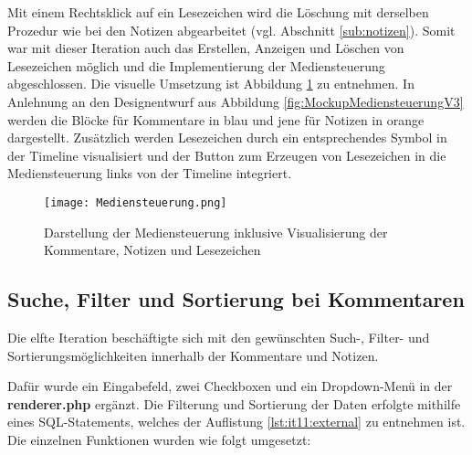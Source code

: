 Mit einem Rechtsklick auf ein Lesezeichen wird die Löschung mit derselben Prozedur wie bei den Notizen abgearbeitet (vgl. Abschnitt \ref{sub:notizen}). Somit war mit dieser Iteration auch das Erstellen, Anzeigen und Löschen von Lesezeichen möglich und die Implementierung der Mediensteuerung abgeschlossen. Die visuelle Umsetzung ist Abbildung \ref{fig:Mediensteuerung} zu entnehmen. In Anlehnung an den Designentwurf aus Abbildung \ref{fig:MockupMediensteuerungV3} werden die Blöcke für Kommentare in blau und jene für Notizen in orange dargestellt. Zusätzlich werden Lesezeichen durch ein entsprechendes Symbol in der Timeline visualisiert und der Button zum Erzeugen von Lesezeichen in die Mediensteuerung links von der Timeline integriert.

\begin{figure}[h!]
\texttt{[image: Mediensteuerung.png]}
\caption{\label{fig:Mediensteuerung}Darstellung der Mediensteuerung inklusive Visualisierung der Kommentare, Notizen und Lesezeichen}
\end{figure}

\subsection{Suche, Filter und Sortierung bei Kommentaren}
Die elfte Iteration beschäftigte sich mit den gewünschten Such-, Filter- und Sortierungsmöglichkeiten innerhalb der Kommentare und Notizen.

Dafür wurde ein Eingabefeld, zwei Checkboxen und ein Dropdown-Menü in der \textbf{renderer.php} ergänzt. Die Filterung und Sortierung der Daten erfolgte mithilfe eines SQL-Statements, welches der Auflistung \ref{lst:it11:external} zu entnehmen ist. Die einzelnen Funktionen wurden wie folgt umgesetzt:

